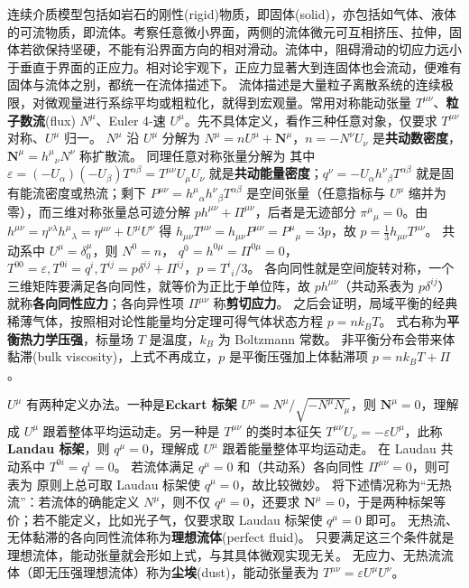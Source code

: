 连续介质模型包括如岩石的刚性(rigid)物质，即固体(solid)，亦包括如气体、液体的可流物质，即流体。考察任意微小界面，两侧的流体微元可互相挤压、拉伸，固体若欲保持坚硬，不能有沿界面方向的相对滑动。流体中，阻碍滑动的切应力远小于垂直于界面的正应力。相对论宇观下，正应力显著大到连固体也会流动，便难有固体与流体之别，都统一在流体描述下。
流体描述是大量粒子离散系统的连续极限，对微观量进行系综平均或粗粒化，就得到宏观量。常用对称能动张量 $T^{\mu\nu}$、\textbf{粒子数流}(flux) $N^\mu$、Euler 4-速 $U^\mu$。先不具体定义，看作三种任意对象，仅要求 $T^{\mu\nu}$ 对称、$U^\mu$ 归一。
$N^\mu$ 沿 $U^\mu$ 分解为 $N^\mu=n U^\mu + \bm N^\mu$，$n=-N^\nu U_\nu$ 是\textbf{共动数密度}，$\bm N^\mu=h^\mu{}_\nu N^\nu$ 称扩散流。
同理任意对称张量分解为
其中 $\varepsilon= (-U_\alpha)(-U_\beta)T^{\alpha\beta} = T^{\mu\nu}U_\mu U_\nu$ 就是\textbf{共动能量密度}；$q^\nu=-U_\alpha h^\nu{}_{\beta}T^{\alpha\beta}$ 就是固有能流密度或热流；剩下 $P^{\mu\nu}=h^\mu{}_{\alpha}h^\nu{}_{\beta}T^{\alpha\beta}$ 是空间张量（任意指标与 $U^\mu$ 缩并为零），而三维对称张量总可迹分解 $ph^{\mu\nu}+\Pi^{\mu\nu}$，后者是无迹部分 $\pi^\mu{}_\mu=0$。由$h^{\mu\nu}=\eta^{\nu\lambda}h^\mu{}_\lambda=\eta^{\mu\nu}+U^\mu U^\nu$ 得 $h_{\mu\nu}T^{\mu\nu}=h_{\mu\nu}P^{\mu\nu}=P^\mu{}_\mu=3p$，故 $p=\frac13h_{\mu\nu}T^{\mu\nu}$。
共动系中 $U^\mu=\delta^\mu_0$，则 $N^0=n$， $q^0=h^{0\mu}=\Pi^{0\mu}=0$，$T^{00}=\varepsilon,T^{0i}=q^i,T^{ij}=p\delta^{ij}+\Pi^{ij}$，$p=T^i{}_i/3$。
各向同性就是空间旋转对称，一个三维矩阵要满足各向同性，就等价为正比于单位阵，故 $p h^{\mu\nu}$（共动系表为 $p\delta^{ij}$）就称\textbf{各向同性应力}；各向异性项 $\Pi^{\mu\nu}$ 称\textbf{剪切应力}。
之后会证明，局域平衡的经典稀薄气体，按照相对论性能量均分定理可得气体状态方程 $p=nk_B T$。
式右称为\textbf{平衡热力学压强}，标量场 $T$ 是温度，$k_B$ 为 Boltzmann 常数。
非平衡分布会带来体黏滞(bulk viscosity)，上式不再成立，$p$ 是平衡压强加上体黏滞项 $p=nk_B T+\Pi$。

$U^\mu$ 有两种定义办法。一种是\textbf{Eckart 标架} $U^\mu = N^\mu/\sqrt{-N^\mu N_\mu}$，则 $\bm N^\mu=0$，理解成 $U^\mu$ 跟着整体平均运动走。另一种是 $T^{\mu\nu}$ 的类时本征矢 $T^{\mu\nu}U_\nu=-\varepsilon U^\mu$，此称\textbf{Landau 标架}，则 $q^\mu=0$，理解成 $U^\mu$ 跟着能量整体平均运动走。
在 Laudau 共动系中 $T^{0i}=q^i=0$。
若流体满足 $q^\mu=0$ 和（共动系）各向同性 $\Pi^{\mu\nu}=0$，则可表为
原则上总可取 Laudau 标架使 $q^\mu=0$，故比较微妙。
将下述情况称为“无热流”：若流体的确能定义 $N^\mu$，则不仅 $q^\mu=0$，还要求 $\bm N^\mu=0$，于是两种标架等价；若不能定义，比如光子气，仅要求取 Laudau 标架使 $q^\mu=0$ 即可。
无热流、无体黏滞的各向同性流体称为\textbf{理想流体}(perfect fluid)。
只要满足这三个条件就是理想流体，能动张量就会形如上式，与其具体微观实现无关。
无应力、无热流流体（即无压强理想流体）称为\textbf{尘埃}(dust)，能动张量表为 $T^{\mu\nu}=\varepsilon U^\mu U^\nu$。

